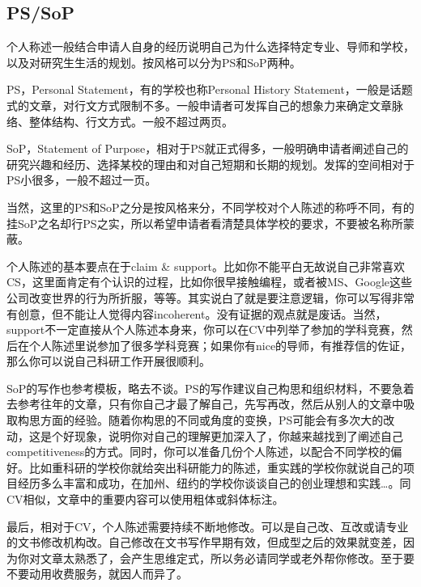 \subsection{PS/SoP}

个人称述一般结合申请人自身的经历说明自己为什么选择特定专业、导师和学校，以及对研究生生活的规划。按风格可以分为PS和SoP两种。\par

PS，Personal Statement，有的学校也称Personal History Statement，一般是话题式的文章，对行文方式限制不多。一般申请者可发挥自己的想象力来确定文章脉络、整体结构、行文方式。一般不超过两页。\par

SoP，Statement of Purpose，相对于PS就正式得多，一般明确申请者阐述自己的研究兴趣和经历、选择某校的理由和对自己短期和长期的规划。发挥的空间相对于PS小很多，一般不超过一页。\par

当然，这里的PS和SoP之分是按风格来分，不同学校对个人陈述的称呼不同，有的挂SoP之名却行PS之实，所以希望申请者看清楚具体学校的要求，不要被名称所蒙蔽。\par

个人陈述的基本要点在于claim \& support。比如你不能平白无故说自己非常喜欢CS，这里面肯定有个认识的过程，比如你很早接触编程，或者被MS、Google这些公司改变世界的行为所折服，等等。其实说白了就是要注意逻辑，你可以写得非常有创意，但不能让人觉得内容incoherent。没有证据的观点就是废话。当然，support不一定直接从个人陈述本身来，你可以在CV中列举了参加的学科竞赛，然后在个人陈述里说参加了很多学科竞赛；如果你有nice的导师，有推荐信的佐证，那么你可以说自己科研工作开展很顺利。\par

SoP的写作也参考模板，略去不谈。PS的写作建议自己构思和组织材料，不要急着去参考往年的文章，只有你自己才最了解自己，先写再改，然后从别人的文章中吸取构思方面的经验。随着你构思的不同或角度的变换，PS可能会有多次大的改动，这是个好现象，说明你对自己的理解更加深入了，你越来越找到了阐述自己competitiveness的方式。同时，你可以准备几份个人陈述，以配合不同学校的偏好。比如重科研的学校你就给突出科研能力的陈述，重实践的学校你就说自己的项目经历多么丰富和成功，在加州、纽约的学校你谈谈自己的创业理想和实践\ldots{}。同CV相似，文章中的重要内容可以使用粗体或斜体标注。\par

最后，相对于CV，个人陈述需要持续不断地修改。可以是自己改、互改或请专业的文书修改机构改。自己修改在文书写作早期有效，但成型之后的效果就变差，因为你对文章太熟悉了，会产生思维定式，所以务必请同学或老外帮你修改。至于要不要动用收费服务，就因人而异了。
